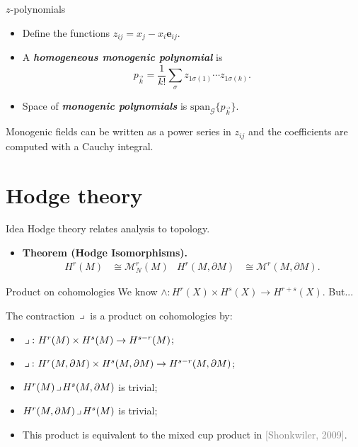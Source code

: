 \documentclass[aspectratio=169,handout]{beamer}
\newcommand\boldgreen[1]{\textcolor{lighter_csu_green}{\emph{\textbf{#1}}}}
\newcommand\boldgold[1]{\textcolor{csu_gold}{\textbf{#1}}}
\newcommand\grey[1]{\textcolor{gray}{#1}}
\newcommand{\G}{\mathcal{G}}
\newcommand{\monogenics}{\mathcal{M}}
\newcommand{\blade}[1]{\boldsymbol{#1}}
\newcommand{\boundary}{{\partial M}}
\newcommand{\contract}{\hspace*{.5mm} \lrcorner \hspace*{.5mm}}
\begin{document}
\begin{frame}{$z$-polynomials}
\vfill
\begin{itemize}
\pause
\item Define the functions $z_{ij}=x_j-x_i \blade{e}_{ij}$.
\pause
\item A \boldgreen{homogeneous monogenic polynomial} is
\[
p_{\vec{k}} = \frac{1}{k!} \sum_{\sigma} z_{1\sigma(1)}\cdots z_{1\sigma(k)}.
\]
\pause
\item Space of \boldgreen{monogenic polynomials} is $\mathrm{span}_\G \{p_{\vec{k}}\}$.
\end{itemize}
\pause
\begin{proposition*}{}{}
Monogenic fields can be written as a power series in $z_{ij}$ and the coefficients are computed with a Cauchy integral.
\end{proposition*}
\vfill
\end{frame}


\section{Hodge theory}

\begin{frame}{Idea}
\vfill
Hodge theory relates analysis to topology.
\begin{itemize}
  \pause
  \item \boldgold{Theorem (Hodge Isomorphisms).
  \begin{align*}
    H^r(M) &\cong \monogenics^r_N(M) & H^r(M,\boundary)&\cong \monogenics^r(M,\boundary).
  \end{align*}
  }
  \pause
\end{itemize}
\vspace*{-0.5cm}
\begin{figure}[H]
    \centering
    \def\svgwidth{\columnwidth}
\resizebox{.50\textwidth}{!}{}
\end{figure}
\vfill
\end{frame}

\begin{frame}{Product on cohomologies}
\vfill
\pause
We know $\wedge \colon H^r(X) \times H^s(X) \to H^{r+s}(X)$. \pause But...
\begin{proposition*}{}{}
The contraction $\contract$ is a product on cohomologies by:
\textcolor{lighter_csu_green}{
\begin{itemize}
\item $\contract \colon H^r(M)\times H^s(M) \to H^{s-r}(M)$;
\item $\contract \colon H^r(M,\boundary)\times H^s(M,\boundary) \to H^{s-r}(M,\boundary)$;
\item $H^r(M)\contract H^s(M,\boundary)$ is trivial;
\item $H^r(M,\boundary)\contract H^s(M)$ is trivial;
\end{itemize}
}
\end{proposition*}
\pause
\begin{itemize}
  \item This product is equivalent to the mixed cup product in \grey{[Shonkwiler, 2009]}.
\end{itemize}
\vfill
\end{frame}
\end{document}
